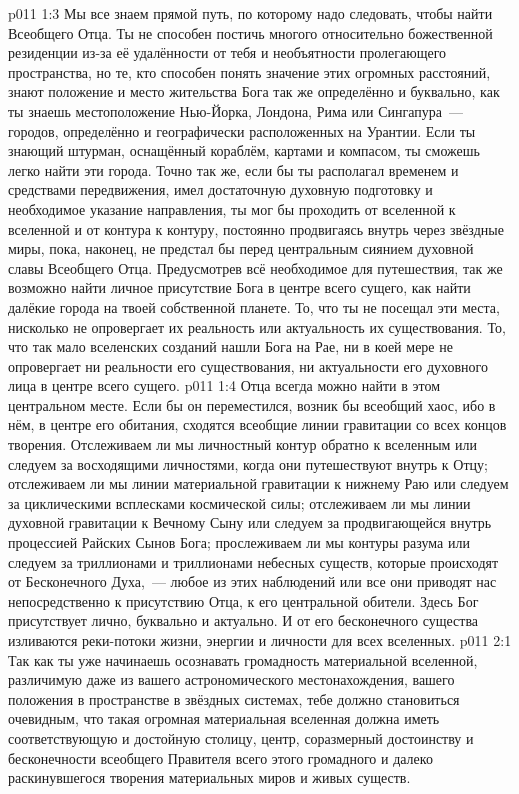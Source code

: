 \vs p011 1:3 \pc Мы все знаем прямой путь, по которому надо следовать, чтобы найти Всеобщего Отца. Ты не способен постичь многого относительно божественной резиденции из\hyp{}за её удалённости от тебя и необъятности пролегающего пространства, но те, кто способен понять значение этих огромных расстояний, знают положение и место жительства Бога так же определённо и буквально, как ты знаешь местоположение Нью\hyp{}Йорка, Лондона, Рима или Сингапура~--- городов, определённо и географически расположенных на Урантии. Если ты знающий штурман, оснащённый кораблём, картами и компасом, ты сможешь легко найти эти города. Точно так же, если бы ты располагал временем и средствами передвижения, имел достаточную духовную подготовку и необходимое указание направления, ты мог бы проходить от вселенной к вселенной и от контура к контуру, постоянно продвигаясь внутрь через звёздные миры, пока, наконец, не предстал бы перед центральным сиянием духовной славы Всеобщего Отца. Предусмотрев всё необходимое для путешествия, так же возможно найти личное присутствие Бога в центре всего сущего, как найти далёкие города на твоей собственной планете. То, что ты не посещал эти места, нисколько не опровергает их реальность или актуальность их существования. То, что так мало вселенских созданий нашли Бога на Рае, ни в коей мере не опровергает ни реальности его существования, ни актуальности его духовного лица в центре всего сущего.
\vs p011 1:4 Отца всегда можно найти в этом центральном месте. Если бы он переместился, возник бы всеобщий хаос, ибо в нём, в центре его обитания, сходятся всеобщие линии гравитации со всех концов творения. Отслеживаем ли мы личностный контур обратно к вселенным или следуем за восходящими личностями, когда они путешествуют внутрь к Отцу; отслеживаем ли мы линии материальной гравитации к нижнему Раю или следуем за циклическими всплесками космической силы; отслеживаем ли мы линии духовной гравитации к Вечному Сыну или следуем за продвигающейся внутрь процессией Райских Сынов Бога; прослеживаем ли мы контуры разума или следуем за триллионами и триллионами небесных существ, которые происходят от Бесконечного Духа,~--- любое из этих наблюдений или все они приводят нас непосредственно к присутствию Отца, к его центральной обители. Здесь Бог присутствует лично, буквально и актуально. И от его бесконечного существа изливаются реки\hyp{}потоки жизни, энергии и личности для всех вселенных.
\vs p011 2:1 Так как ты уже начинаешь осознавать громадность материальной вселенной, различимую даже из вашего астрономического местонахождения, вашего положения в пространстве в звёздных системах, тебе должно становиться очевидным, что такая огромная материальная вселенная должна иметь соответствующую и достойную столицу, центр, соразмерный достоинству и бесконечности всеобщего Правителя всего этого громадного и далеко раскинувшегося творения материальных миров и живых существ.
